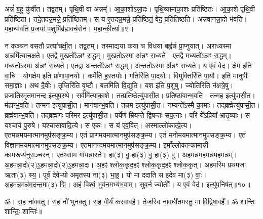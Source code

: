 अन्नं॑ ब॒हु कु॑र्वीत। 
तद्व्र॒तम्। 
पृ॒थि॒वी वा अन्नम्᳚। 
आ॒का॒शो᳚ऽन्ना॒दः। 
पृ॒थि॒व्यामा॑का॒शः प्रति॑\-ष्ठितः। 
आ॒का॒शे पृ॑थि॒वी प्रति॑\-ष्ठिता। 
तदे॒तदन्न॒मन्ने॒ प्रति॑\-ष्ठितम्। 
स य ए॒तदन्न॒मन्ने॒ प्रति॑\-ष्ठितं॒ वेद॒ प्रति॑\-तिष्ठति। 
अन्न॑वानन्ना॒दो भ॑वति। 
म॒हान्भ॑वति प्र॒जया॑ प॒शुभि॑र्ब्रह्मवर्च॒सेन॑। 
म॒हान्की॒र्त्या॥९॥

न कञ्चन वसतौ प्रत्या॑चक्षी॒त। 
तद्व्र॒तम्। 
तस्माद्यया कया च विधया बह्व॑न्नं प्रा॒प्नुयात्। 
अराध्यस्मा अन्नमि॑त्याच॒क्षते। 
एतद्वै मुखतो᳚\-ऽन्नꣳ रा॒द्धम्। 
मुखतोऽस्मा अ॑न्नꣳ रा॒ध्यते। 
एतद्वै मध्यतो᳚\-ऽन्नꣳ रा॒द्धम्। 
मध्यतोऽस्मा अ॑न्नꣳ रा॒ध्यते। 
एतद्वा अन्ततो᳚\-ऽन्नꣳ रा॒द्धम्। 
अन्ततोऽस्मा अ॑न्नꣳ रा॒ध्यते। 
य ए॑वं वे॒द। 
क्षेम इ॑ति वा॒चि। 
योगक्षेम इति प्रा॑णापा॒नयोः। 
कर्मे॑ति ह॒स्तयोः। 
गतिरि॑ति पा॒दयोः। 
विमुक्तिरि॑ति पा॒यौ। 
इति मानुषीः᳚ समा॒ज्ञाः। 
अथ दै॒वीः। 
तृप्तिरि॑ति वृ॒ष्टौ। 
बलमि॑ति वि॒द्युति। 
यश इ॑ति प॒शुषु। 
ज्योतिरिति न॑क्षत्रे॒षु। 
प्रजातिरमृतमानन्द इ॑त्युप॒स्थे। 
सर्वमि॑त्याका॒शे। 
तत्प्रति\-ष्ठेत्यु॑पासी॒त। 
प्रति\-ष्ठा॑वान्भ॒वति। 
तन्मह इत्यु॑पासी॒त। 
म॑हान्भ॒वति। 
तन्मन इत्यु॑पासी॒त। 
मान॑वान्भ॒वति। 
तन्नम इत्यु॑पासी॒त। 
नम्यन्ते᳚ऽस्मै का॒माः। 
तद्ब्रह्मेत्यु॑पासी॒त। 
ब्रह्म॑वान्भ॒वति। 
तद्ब्रह्मणः परिमर इत्यु॑पासी॒त। 
पर्येणं म्रियन्ते द्विषन्तः॑ सप॒त्नाः। 
परि ये᳚ऽप्रिया᳚ भ्रातृ॒व्याः। 
स यश्चा॑यं पु॒रुषे। 
यश्चासा॑वादि॒त्ये। 
स एकः॑। 
स य॑ एवं॒वित्। 
अस्माल्लो॑कात्प्रे॒त्य। 
एतमन्न\-मय\-मात्मानमुप॑सङ्क्र॒म्य। 
एतं प्राण\-मय\-मात्मानमुप॑सङ्क्र॒म्य। 
एतं मनो\-मय\-मात्मानमुप॑\-सङ्क्र॒म्य। 
एतं विज्ञान\-मय\-मात्मानमुप॑\-सङ्क्र॒म्य। 
एतमानन्द\-मय\-मात्मानमुप॑सङ्क्र॒म्य। 
इमाँल्लोकान्कामान्नी कामरूप्य॑नु\-स॒ञ्चरन्। 
एतथ्साम गा॑यन्ना॒स्ते। 
हा(३) वु॒ हा(३) वु॒ हा(३) वु॑। 
अ॒हमन्नम॒हमन्नम॒हमन्नम्। 
अ॒हमन्ना॒दो(२)\-ऽ॒हमन्ना॒दो(२)\-ऽ॒हमन्ना॒दः। 
अ॒हꣴ श्लोक॒कृद॒हꣴ श्लोक॒कृद॒हꣴ श्लोक॒कृत्। 
अहमस्मि प्रथमजा ऋता(३) स्य॒। 
पूर्वं देवेभ्यो अमृतस्य ना(३) भा॒इ॒। 
यो मा ददाति स इदेव मा(३) वाः॒। 
अ॒हमन्न॒मन्न॑म॒दन्त॒मा(३) द्मि॒। 
अ॒हं विश्वं॒ भुव॑न॒मभ्य॑भ॒वाम्। 
सुव॒र्न ज्योतीः᳚। 
य ए॒वं वेद॑। 
इत्यु॑प॒निष॑त्॥१०॥

ॐ। स॒ह ना॑ववतु। 
स॒ह नौ॑ भुनक्तु। 
स॒ह वी॒र्यं॑ करवावहै। 
ते॒ज॒स्वि ना॒वधी॑तमस्तु॒ मा वि॑द्विषा॒वहै᳚। 
ॐ शान्तिः॒ शान्तिः॒ शान्तिः॑॥


\noindent\hyperref[sec:start_taittiriyopanishat]{\closesection}


